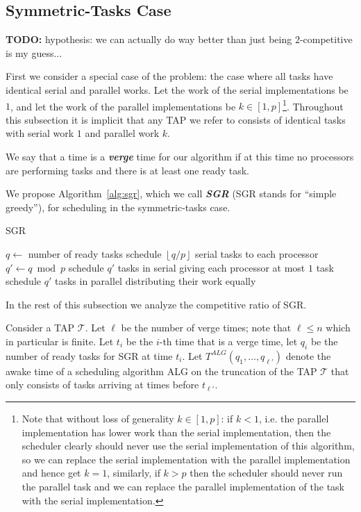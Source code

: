 \documentclass[twocolumn]{article}[10pt]
\newcommand{\defn}[1]{{\textit{\textbf{\boldmath #1}}}\xspace}
\newcommand{\todo}[1]{{\color{red}\textbf{TODO:} #1}}
\newcommand{\floor}[1]{\left\lfloor #1 \right\rfloor}
\begin{document}
\subsection{Symmetric-Tasks Case}
\label{subsec:symmetrictasks}
\todo{hypothesis: we can actually do way better than just being
$2$-competitive is my guess...}

First we consider a special case of the problem: the case where
all tasks have identical serial and parallel works. Let
the work of the serial implementations be $1$, and let the work
of the parallel implementations be $k \in [1, p]$\footnote{Note that
without loss of generality $k \in [1,p]$: if $k < 1$, i.e. the
parallel implementation has lower work than the serial
implementation, then the scheduler clearly should never use the serial
implementation of this algorithm, so we can replace the serial
implementation with the parallel implementation and hence get
$k=1$, similarly, if $k > p$ then the scheduler should never run
the parallel task and we can replace the parallel implementation
of the task with the serial implementation.}. Throughout this
subsection it is implicit that any TAP we
refer to consists of identical tasks with serial work $1$ and parallel work $k$.

We say that a time is a \defn{verge} time for our algorithm if at
this time no processors are performing tasks and there is at
least one ready task.

We propose Algorithm~\ref{alg:sgr}, which we call \defn{SGR}
(SGR stands for \enquote{simple greedy}),
for scheduling in the symmetric-tasks case.

\begin{algorithm}
  \caption{SGR}
  \label{alg:sgr}
  \begin{algorithmic}
        \State $q \gets $ number of ready tasks
        \State schedule $\floor{q/p}$ serial tasks to each processor
        \State $q' \gets q\bmod p$
          \State schedule $q'$ tasks in serial
          \State giving each processor at most $1$ task
        \Else
          \State schedule $q'$ tasks in parallel
          \State distributing their work equally 
        \EndIf
      \EndIf
    \EndWhile
  \end{algorithmic}
\end{algorithm}

In the rest of this subsection we analyze the competitive ratio of SGR.

Consider a TAP $\mathcal{T}$. Let $\ell$ be the number of verge
times; note that $\ell \le n$ which in particular is finite. Let
$t_i$ be the $i$-th time that is a verge time, let $q_i$ be the
number of ready tasks for SGR at time $t_i$. Let $T^{ALG}(q_1,
\ldots, q_{\ell'})$ denote the awake time of a scheduling algorithm
ALG on the truncation of the TAP $\mathcal{T}$ that only consists
of tasks arriving at times before $t_{\ell'}$.
\end{document}
